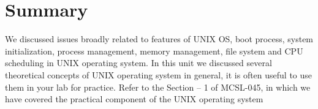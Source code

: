 \documentclass{article}
\begin{document}
\section{Summary}
We discussed issues broadly related to features of UNIX OS, boot process,
system initialization, process management, memory management, file system and
CPU scheduling in UNIX operating system. In this unit we discussed several
theoretical concepts of UNIX operating system in general, it is often useful to use
them in your lab for practice. Refer to the Section – 1 of MCSL-045, in which we
have covered the practical component of the UNIX operating system
\end{document}
